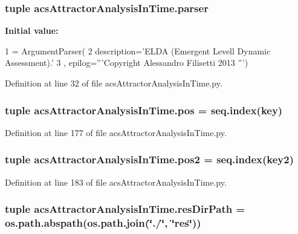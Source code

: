 \hypertarget{a00123_abed547533f84e18ca5b4c4a2cfaef63a}{
\subsubsection[{parser}]{\setlength{\rightskip}{0pt plus 5cm}tuple acs\-Attractor\-Analysis\-In\-Time.\-parser}}\label{a00123_abed547533f84e18ca5b4c4a2cfaef63a}
{\bfseries Initial value\-:}
\begin{DoxyCode}
1 = ArgumentParser(
2                                 description=\textcolor{stringliteral}{'ELDA (Emergent Levell Dynamic       Assessment).'}
3                                 , epilog=\textcolor{stringliteral}{'''Copyright Alessandro Filisetti 2013 '''})
\end{DoxyCode}


Definition at line 32 of file acs\-Attractor\-Analysis\-In\-Time.\-py.

\hypertarget{a00123_aa39692272363cd6f687c4b2a53f96594}{
\subsubsection[{pos}]{\setlength{\rightskip}{0pt plus 5cm}tuple acs\-Attractor\-Analysis\-In\-Time.\-pos = {\bf seq.\-index}(key)}}\label{a00123_aa39692272363cd6f687c4b2a53f96594}


Definition at line 177 of file acs\-Attractor\-Analysis\-In\-Time.\-py.

\hypertarget{a00123_a49fec7e1deea4728b5ef4a487d155de9}{
\subsubsection[{pos2}]{\setlength{\rightskip}{0pt plus 5cm}tuple acs\-Attractor\-Analysis\-In\-Time.\-pos2 = {\bf seq.\-index}(key2)}}\label{a00123_a49fec7e1deea4728b5ef4a487d155de9}


Definition at line 183 of file acs\-Attractor\-Analysis\-In\-Time.\-py.

\hypertarget{a00123_a28ca19f0f566396ef664e068a41a2837}{
\subsubsection[{res\-Dir\-Path}]{\setlength{\rightskip}{0pt plus 5cm}tuple acs\-Attractor\-Analysis\-In\-Time.\-res\-Dir\-Path = os.\-path.\-abspath(os.\-path.\-join(\char`\"{}./\char`\"{}, \char`\"{}res\char`\"{}))}}\label{a00123_a28ca19f0f566396ef664e068a41a2837}


